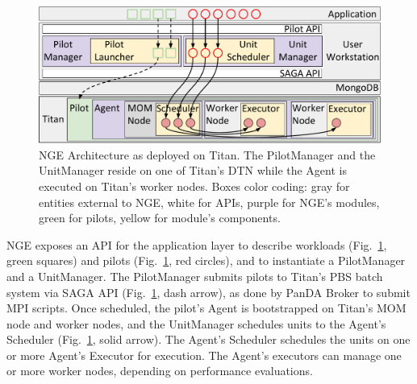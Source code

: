 \begin{figure}
  \centering
   \includegraphics[width=\columnwidth]{figures/rp_architecture_compact_atlaswms_paper.pdf}
  \caption{NGE Architecture as deployed on Titan. The PilotManager and the
  UnitManager reside on one of Titan's DTN while the Agent is executed on
  Titan's worker nodes. Boxes color coding: gray for entities external to NGE,
  white for APIs, purple for NGE's modules, green for pilots, yellow for
  module's components.}
\label{fig:arch-overview}
\end{figure}



NGE exposes an API for the application layer to describe workloads
(Fig.~\ref{fig:arch-overview}, green squares) and pilots
(Fig.~\ref{fig:arch-overview}, red circles), and to instantiate a PilotManager
and a UnitManager. The PilotManager submits pilots to Titan's PBS batch system
via SAGA API (Fig.~\ref{fig:arch-overview}, dash arrow), as done by PanDA Broker
to submit MPI scripts. Once scheduled, the pilot's Agent is bootstrapped on
Titan's MOM node and worker nodes, and  the UnitManager schedules units to the
Agent's Scheduler (Fig.~\ref{fig:arch-overview}, solid arrow). The Agent's
Scheduler schedules the units on one or more Agent's Executor for execution. The
Agent's executors can manage one or more worker nodes, depending on performance
evaluations.

